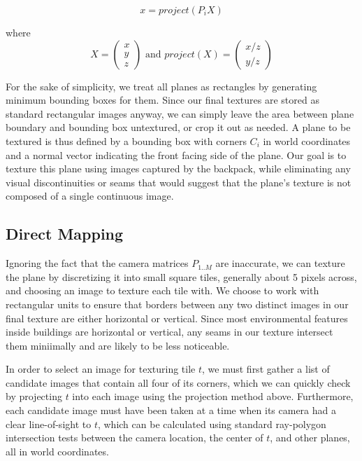 \message{ !name(paper.tex)}\documentclass[10pt,twocolumn,letterpaper]{article}
\begin{document}
\[
x=project(P_iX)
\]

where
\[X = \begin{pmatrix} x \\ y \\ z \end{pmatrix} \textrm{ and }
project(X) = \begin{pmatrix} x/z \\ y/z \end{pmatrix}
\]

For the sake of simplicity, we treat all planes as rectangles by
generating minimum bounding boxes for them. Since our final textures
are stored as standard rectangular images anyway, we can simply
leave the area between plane boundary and bounding box untextured, or
crop it out as needed. A plane to be textured is thus defined by a
bounding box with corners $C_i$ in world coordinates and a normal
vector indicating the front facing side of the plane. Our goal is to
texture this plane using images captured by the backpack, while
eliminating any visual discontinuities or seams that would suggest
that the plane's texture is not composed of a single continuous
image.

\subsection{Direct Mapping}
\label{sec:directMapping}

Ignoring the fact that the camera matrices $P_{1..M}$ are inaccurate,
we can texture the plane by discretizing it into small square tiles,
generally about 5 pixels across, and choosing an image to texture each
tile with. We choose to work with rectangular units to ensure that
borders between any two distinct images in our final texture are
either horizontal or vertical. Since most environmental features
inside buildings are horizontal or vertical, any seams in our texture
intersect them miniimally and are likely to be less noticeable.

In order to select an image for texturing tile $t$, we must first
gather a list of candidate images that contain all four of its
corners, which we can quickly check by projecting $t$ into each image
using the projection method above. Furthermore, each candidate image
must have been taken at a time when its camera had a clear
line-of-sight to $t$, which can be calculated using standard
ray-polygon intersection tests between the camera location, the center
of $t$, and other planes, all in world coordinates.
\end{document}
